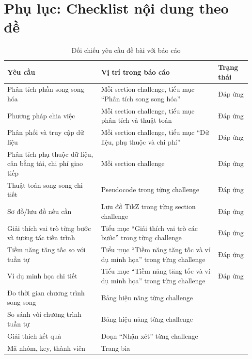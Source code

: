 \section{Phụ lục: Checklist nội dung theo đề}
\label{sec:appendix-rubric}

\begin{table}[H]
\centering
\footnotesize
{}
\renewcommand{\arraystretch}{1.05}
\caption{Đối chiếu yêu cầu đề bài với báo cáo}
\begin{tabularx}{\linewidth}{@{}>{\raggedright\arraybackslash}p{3.1cm}Y>{\raggedright\arraybackslash}p{2.2cm}@{}}
\toprule
Yêu cầu & Vị trí trong báo cáo & Trạng thái \\
\midrule
Phân tích phần song song hóa & Mỗi section challenge, tiểu mục ``Phân tích song song hóa'' & Đáp ứng \\
Phương pháp chia việc & Mỗi section challenge, tiểu mục phân tích và thuật toán & Đáp ứng \\
Phân phối và truy cập dữ liệu & Mỗi section challenge, tiểu mục ``Dữ liệu, phụ thuộc và chi phí'' & Đáp ứng \\
Phân tích phụ thuộc dữ liệu, cân bằng tải, chi phí giao tiếp & Mỗi section challenge & Đáp ứng \\
Thuật toán song song chi tiết & Pseudocode trong từng challenge & Đáp ứng \\
Sơ đồ/lưu đồ nếu cần & Lưu đồ TikZ trong từng section challenge & Đáp ứng \\
Giải thích vai trò từng bước và tương tác tiến trình & Tiểu mục ``Giải thích vai trò các bước'' trong từng challenge & Đáp ứng \\
Tiềm năng tăng tốc so với tuần tự & Tiểu mục ``Tiềm năng tăng tốc và ví dụ minh họa'' trong từng challenge & Đáp ứng \\
Ví dụ minh họa chi tiết & Tiểu mục ``Tiềm năng tăng tốc và ví dụ minh họa'' trong từng challenge & Đáp ứng \\
Đo thời gian chương trình song song & Bảng hiệu năng từng challenge &  \\
So sánh với chương trình tuần tự & Bảng hiệu năng từng challenge &  \\
Giải thích kết quả & Đoạn ``Nhận xét'' từng challenge &  \\
Mã nhóm, key, thành viên & Trang bìa &  \\
\bottomrule
\end{tabularx}
\normalsize
\end{table}
